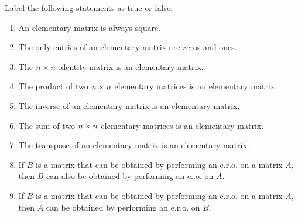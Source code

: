 \begin{exercise} \label{exercise 3.1.1}
Label the following statements as true or false.
\begin{enumerate}
\item An elementary matrix is always square.
\item The only entries of an elementary matrix are zeros and ones. \item The \(n \times n\) identity matrix is an elementary matrix.
\item The product of two \(n \times n\) elementary matrices is an elementary matrix.
\item The inverse of an elementary matrix is an elementary matrix.
\item The sum of two \(n \times n\) elementary matrices is an elementary matrix.
\item The transpose of an elementary matrix is an elementary matrix.
\item If \(B\) is a matrix that can be obtained by performing an e.r.o. on a matrix \(A\), then \(B\) can also be obtained by performing an e.\textbf{}.o. on \(A\).
\item If \(B\) is a matrix that can be obtained by performing an e.r.o. on a matrix \(A\), then \(A\) can be obtained by performing an e.r.o. on \(B\).
\end{enumerate}
\end{exercise}

